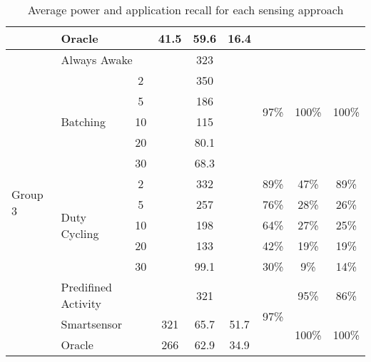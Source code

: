 \begin{table*}[t]
{\begin{tabular}{|l|l|c|c|c|c|c|c|c|}
								& \multicolumn{2}{l|}{Oracle}			& 41.5		& 59.6		& 16.4			& 						& 							& 							\\ \hline \hline
	\multirow{14}{*}{Group 3}	& \multicolumn{2}{l|}{Always Awake}						& \multicolumn{3}{c|}{323}				& \multirow{6}{*}{97\%}	& \multirow{6}{*}{100\%}	& \multirow{6}{*}{100\%}	\\ \cline{2-6}
								& \multirow{5}{*}{Batching}		& 2						& \multicolumn{3}{c|}{350}				&						&							&							\\ \cline{3-6}
								& 								& 5						& \multicolumn{3}{c|}{186}				&						&							&							\\ \cline{3-6}
								& 								& 10					& \multicolumn{3}{c|}{115}				&						&							&							\\ \cline{3-6}
								& 								& 20					& \multicolumn{3}{c|}{80.1}				&						&							&							\\ \cline{3-6}
								& 								& 30					& \multicolumn{3}{c|}{68.3}				&						&							&							\\ \cline{2-9}
								& \multirow{5}{*}{Duty Cycling}	& 2						& \multicolumn{3}{c|}{332}				& 89\%					& 47\%						& 89\%						\\ \cline{3-9}
								& 								& 5						& \multicolumn{3}{c|}{257}				& 76\%					& 28\%						& 26\%						\\ \cline{3-9}
								& 								& 10					& \multicolumn{3}{c|}{198}				& 64\%					& 27\%						& 25\%						\\ \cline{3-9}
								& 								& 20					& \multicolumn{3}{c|}{133}				& 42\%					& 19\%						& 19\%						\\ \cline{3-9}
								& 								& 30					& \multicolumn{3}{c|}{99.1}				& 30\%					& 9\%						& 14\%						\\ \cline{2-9}
								& \multicolumn{2}{l|}{Predifined Activity}	& \multicolumn{3}{c|}{321}				& \multirow{3}{*}{97\%}	& 95\%						& 86\%						\\ \cline{2-6}\cline{8-9}
								& \multicolumn{2}{l|}{Smartsensor}	& 321		& 65.7		& 51.7			& 						& \multirow{2}{*}{100\%}	& \multirow{2}{*}{100\%}	\\ \cline{2-6}
								& \multicolumn{2}{l|}{Oracle}			& 266		& 62.9		& 34.9			& 						& 							& 							\\ \hline
    \end{tabular}
}
	\caption{Average power and application recall for each sensing approach}
	\label{table:summaryRecallPower}
\end{table*}
